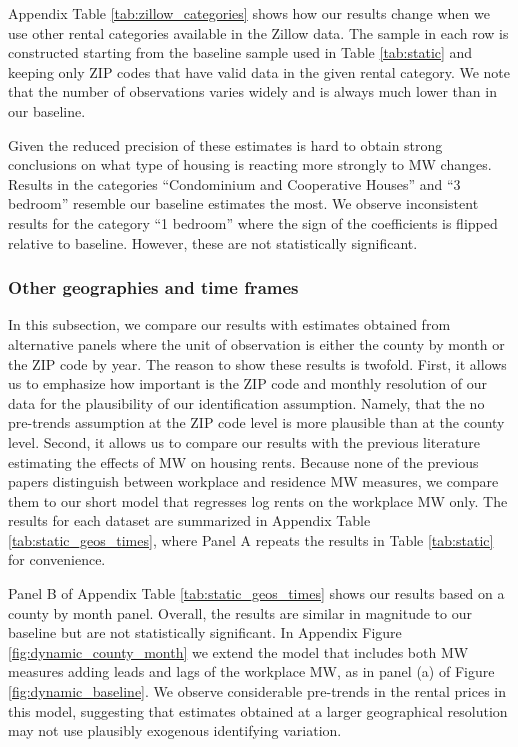 Appendix Table \ref{tab:zillow_categories} shows how our results change when we 
use other rental categories available in the Zillow data.
The sample in each row is constructed starting from the baseline sample used in 
Table \ref{tab:static} and keeping only ZIP codes that have valid data in the 
given rental category.
We note that the number of observations varies widely and is always much lower
than in our baseline.

Given the reduced precision of these estimates is hard to obtain strong 
conclusions on what type of housing is reacting more strongly to MW changes.
Results in the categories ``Condominium and Cooperative Houses'' and 
``3 bedroom'' resemble our baseline estimates the most.
We observe inconsistent results for the category ``1 bedroom'' where the sign 
of the coefficients is flipped relative to baseline.
However, these are not statistically significant.

\subsubsection*{Other geographies and time frames}

In this subsection, we compare our results with estimates obtained from 
alternative panels where the unit of observation is either the county by month 
or the ZIP code by year.
The reason to show these results is twofold.
First, it allows us to emphasize how important is the ZIP code and monthly 
resolution of our data for the plausibility of our identification assumption.
Namely, that the no pre-trends assumption at the ZIP code level is more 
plausible than at the county level.
Second, it allows us to compare our results with the previous literature 
estimating the effects of MW on housing rents.
Because none of the previous papers distinguish between workplace and residence
MW measures, we compare them to our short model that regresses log rents on
the workplace MW only.
The results for each dataset are summarized in Appendix Table 
\ref{tab:static_geos_times}, where Panel A repeats the results in Table 
\ref{tab:static} for convenience.

Panel B of Appendix Table \ref{tab:static_geos_times} shows our results based 
on a county by month panel.
Overall, the results are similar in magnitude to our baseline but are not
statistically significant.
In Appendix Figure \ref{fig:dynamic_county_month} we extend the model
that includes both MW measures adding leads and lags of the workplace MW, as
in panel (a) of Figure \ref{fig:dynamic_baseline}.
We observe considerable pre-trends in the rental prices in this model,
suggesting that estimates obtained at a larger geographical resolution may not 
use plausibly exogenous identifying variation.

